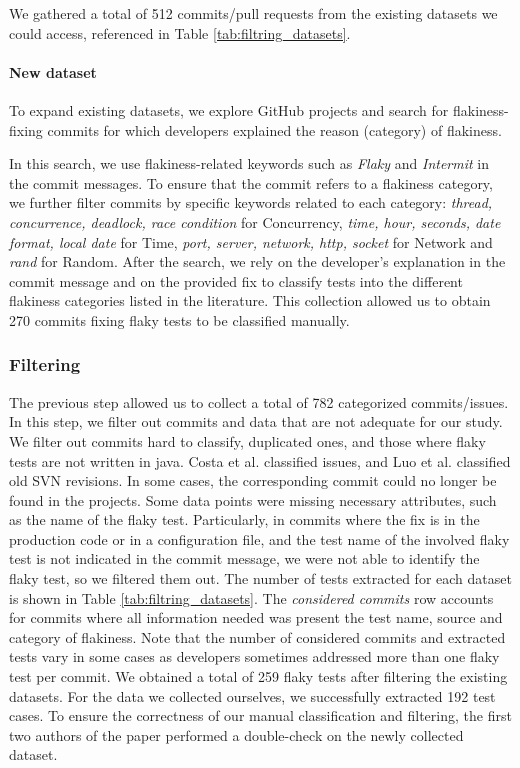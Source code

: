 We gathered a total of 512 commits/pull requests from the existing datasets we could access, referenced in Table \ref{tab:filtring_datasets}.

\paragraph{New dataset}
To expand existing datasets, we explore GitHub projects and search for flakiness-fixing commits for which developers explained the reason (\ie category) of flakiness.

In this search, we use flakiness-related keywords such as \textit{Flaky} and \textit{Intermit} in the commit messages. 
To ensure that the commit refers to a flakiness category, 
we further filter commits by specific keywords related to each category: \textit{thread, concurrence, deadlock, race condition} for Concurrency, \textit{time, hour, seconds, date format, local date} for Time, \textit{port, server, network, http, socket} for Network and \textit{rand} for Random.
After the search, we rely on the developer's explanation in the commit message and on the provided fix to classify tests into the different flakiness categories listed in the literature.
This collection allowed us to obtain 270 commits fixing flaky tests to be classified manually. 

\subsubsection{Filtering}
The previous step allowed us to collect a total of 782 categorized commits/issues. 
In this step, we filter out commits and data that are not adequate for our study. We filter out commits hard to classify, duplicated ones, and those where flaky tests are not written in java. Costa et al. \cite{across_pr} classified issues, and Luo et al. \cite{Luo2014} classified old SVN revisions. In some cases, the corresponding commit could no longer be found in the projects. Some data points were missing necessary attributes, such as the name of the flaky test. Particularly, in commits where the fix is in the production code or in a configuration file, and the test name of the involved flaky test is not indicated in the commit message, we were not able to identify the flaky test, so we filtered them out.
The number of tests extracted for each dataset is shown in Table \ref{tab:filtring_datasets}. The \textit{considered commits} row accounts for commits where all information needed was present \ie the test name, source and category of flakiness. Note that the number of considered commits and extracted tests vary in some cases as developers sometimes addressed more than one flaky test per commit.
We obtained a total of 259 flaky tests after filtering the existing datasets.
For the data we collected ourselves, we successfully extracted 192 test cases. To ensure the correctness of our manual classification and filtering, the first two authors of the paper performed a double-check on the newly collected dataset. 

